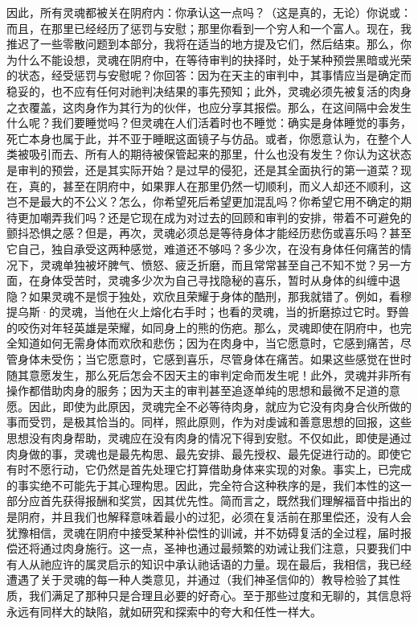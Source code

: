 因此，所有灵魂都被关在阴府内：你承认这一点吗？（这是真的，无论）你说或：而且，在那里已经经历了惩罚与安慰；那里你看到一个穷人和一个富人。现在，我推迟了一些零散问题到本部分，我将在适当的地方提及它们，然后结束。那么，你为什么不能设想，灵魂在阴府中，在等待审判的抉择时，处于某种预尝黑暗或光荣的状态，经受惩罚与安慰呢？你回答：因为在天主的审判中，其事情应当是确定而稳妥的，也不应有任何对祂判决结果的事先预知；此外，灵魂必须先被复活的肉身之衣覆盖，这肉身作为其行为的伙伴，也应分享其报偿。那么，在这间隔中会发生什么呢？我们要睡觉吗？但灵魂在人们活着时也不睡觉：确实是身体睡觉的事务，死亡本身也属于此，并不亚于睡眠这面镜子与仿品。或者，你愿意认为，在整个人类被吸引而去、所有人的期待被保管起来的那里，什么也没有发生？你认为这状态是审判的预尝，还是其实际开始？是过早的侵犯，还是其全面执行的第一道菜？现在，真的，甚至在阴府中，如果罪人在那里仍然一切顺利，而义人却还不顺利，这岂不是最大的不公义？怎么，你希望死后希望更加混乱吗？你希望它用不确定的期待更加嘲弄我们吗？还是它现在成为对过去的回顾和审判的安排，带着不可避免的颤抖恐惧之感？但是，再次，灵魂必须总是等待身体才能经历悲伤或喜乐吗？甚至它自己，独自承受这两种感觉，难道还不够吗？多少次，在没有身体任何痛苦的情况下，灵魂单独被坏脾气、愤怒、疲乏折磨，而且常常甚至自己不知不觉？另一方面，在身体受苦时，灵魂多少次为自己寻找隐秘的喜乐，暂时从身体的纠缠中退隐？如果灵魂不是惯于独处，欢欣且荣耀于身体的酷刑，那我就错了。例如，看穆提乌斯·的灵魂，当他在火上熔化右手时；也看的灵魂，当的折磨掠过它时。野兽的咬伤对年轻英雄是荣耀，如同身上的熊的伤疤。那么，灵魂即使在阴府中，也完全知道如何无需身体而欢欣和悲伤；因为在肉身中，当它愿意时，它感到痛苦，尽管身体未受伤；当它愿意时，它感到喜乐，尽管身体在痛苦。如果这些感觉在世时随其意愿发生，那么死后怎会不因天主的审判定命而发生呢！此外，灵魂并非所有操作都借助肉身的服务；因为天主的审判甚至追逐单纯的思想和最微不足道的意愿。因此，即使为此原因，灵魂完全不必等待肉身，就应为它没有肉身合伙所做的事而受罚，是极其恰当的。同样，照此原则，作为对虔诚和善意思想的回报，这些思想没有肉身帮助，灵魂应在没有肉身的情况下得到安慰。不仅如此，即使是通过肉身做的事，灵魂也是最先构思、最先安排、最先授权、最先促进行动的。即使它有时不愿行动，它仍然是首先处理它打算借助身体来实现的对象。事实上，已完成的事实绝不可能先于其心理构思。因此，完全符合这种秩序的是，我们本性的这一部分应首先获得报酬和奖赏，因其优先性。简而言之，既然我们理解福音中指出的是阴府，并且我们也解释意味着最小的过犯，必须在复活前在那里偿还，没有人会犹豫相信，灵魂在阴府中接受某种补偿性的训诫，并不妨碍复活的全过程，届时报偿还将通过肉身施行。这一点，圣神也通过最频繁的劝诫让我们注意，只要我们中有人从祂应许的属灵启示的知识中承认祂话语的力量。现在最后，我相信，我已经遭遇了关于灵魂的每一种人类意见，并通过（我们神圣信仰的）教导检验了其性质，我们满足了那种只是合理且必要的好奇心。至于那些过度和无聊的，其信息将永远有同样大的缺陷，就如研究和探索中的夸大和任性一样大。\par

